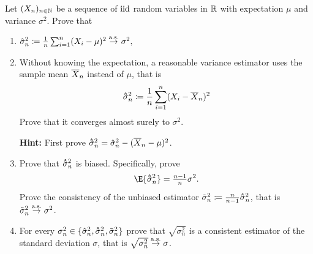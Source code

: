 
\begin{exercise}[subtitle={Variance estimation \Coffeecup}]
    \label{ex: variance estimation}
    Let \((X_n)_{n\in \mathbb{N}}\) be a sequence of \(\operatorname{iid}\) random variables in \(\mathbb{R}\)
    with expectation \(\mu\) and variance \(\sigma^2\). Prove that
    \begin{enumerate}[label=(\alph*),noitemsep]
        \item\label{it: (var estimation) theoretical}
        \(
            \hat\sigma^2_n \coloneq \frac1n\sum_{i=1}^n (X_i-\mu)^2
            \overset{\operatorname{\text{a.s.}}}\to \sigma^2,
        \)

        \item\label{it: (var estimation) sample mean}
        Without knowing the expectation, a reasonable variance estimator
        uses the sample mean \(\overline{X}_n\) instead of \(\mu\), that is
        \[
            \hhat\sigma_n^2 \coloneq \frac1n\sum_{i=1}^n (X_i-\mean{X}_n)^2
        \]
        Prove that it converges almost surely to \(\sigma^2\).
        
        \textbf{Hint:} First prove \(\hhat\sigma_n^2 = \hat\sigma_n^2 - (\mean{X}_n - \mu)^2\).

        \item\label{it: (var estimation) bias and consistency}
        Prove that \(\hhat\sigma_n^2\) is biased. Specifically, prove
        \[
            \E{\hhat\sigma_n^2} = \tfrac{n-1}{n}\sigma^2.
        \]
        Prove the consistency of the unbiased estimator \(\tilde\sigma_n^2 \coloneq \tfrac{n}{n-1}\hhat\sigma_n^2\),
        that is \(\tilde\sigma_n^2 \overset{\operatorname{\text{a.s.}}}\to \sigma^2\).

        \item\label{it: (var estimation) standard deviation}
        For every \(\sigma_n^2 \in \{\hat\sigma_n^2, \hhat\sigma_n^2,
        \tilde\sigma_n^2\}\) prove that \(\sqrt{\sigma_n^2}\) is a consistent
        estimator of the standard deviation \(\sigma\), that is 
        \(\sqrt{\sigma_n^2} \overset{\operatorname{\text{a.s.}}}\to \sigma\).
    \end{enumerate}
\end{exercise}

